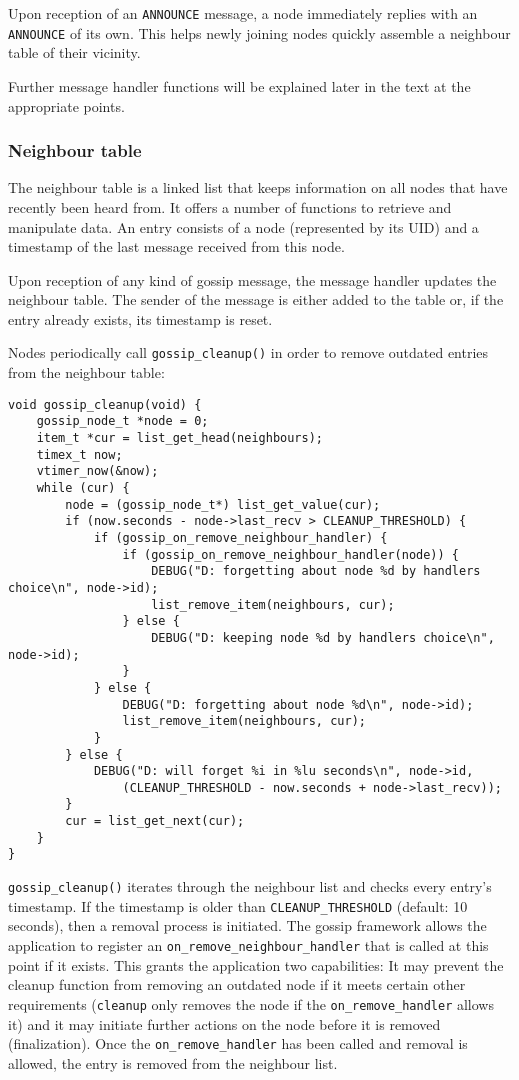 \documentclass[11pt,
  a4paper,
  ngerman,
  BCOR=7mm
]{scrartcl}
\begin{document}
Upon reception of an \lstinline!ANNOUNCE! message, a node immediately
replies with an \lstinline!ANNOUNCE! of its own. This helps newly
joining nodes quickly assemble a neighbour table of their vicinity.

Further message handler functions will be explained later in the text at
the appropriate points.

\subsubsection*{Neighbour table}
\label{ssub:neighbour_table}
The neighbour table is a linked list that keeps information on all nodes
that have recently been heard from. It offers a number of functions to
retrieve and manipulate data. An entry consists of a node (represented
by its UID) and a timestamp of the last message received from this node.

Upon reception of any kind of gossip message, the message handler
updates the neighbour table. The sender of the message is either added
to the table or, if the entry already exists, its timestamp is reset. 

Nodes periodically call \lstinline!gossip_cleanup()! in order to remove
outdated entries from the neighbour table:

\begin{lstlisting}
void gossip_cleanup(void) {
    gossip_node_t *node = 0;
    item_t *cur = list_get_head(neighbours);
    timex_t now;
    vtimer_now(&now);
    while (cur) {
        node = (gossip_node_t*) list_get_value(cur);
        if (now.seconds - node->last_recv > CLEANUP_THRESHOLD) {
            if (gossip_on_remove_neighbour_handler) {
                if (gossip_on_remove_neighbour_handler(node)) {
                    DEBUG("D: forgetting about node %d by handlers choice\n", node->id);
                    list_remove_item(neighbours, cur);
                } else {
                    DEBUG("D: keeping node %d by handlers choice\n", node->id);
                }
            } else {
                DEBUG("D: forgetting about node %d\n", node->id);
                list_remove_item(neighbours, cur);
            }
        } else {
            DEBUG("D: will forget %i in %lu seconds\n", node->id,
                (CLEANUP_THRESHOLD - now.seconds + node->last_recv));
        }
        cur = list_get_next(cur);
    }
}
\end{lstlisting}

\lstinline!gossip_cleanup()! iterates through the neighbour list and
checks every entry's timestamp. If the timestamp is older than
\lstinline!CLEANUP_THRESHOLD! (default: 10 seconds), then a removal
process is initiated. The gossip framework allows the application to
register an \lstinline!on_remove_neighbour_handler! that is called at
this point if it exists. This grants the application two capabilities:
It may prevent the cleanup function from removing an outdated node if it
meets certain other requirements (\lstinline!cleanup! only removes the
node if the \lstinline!on_remove_handler! allows it) and it may initiate
further actions on the node before it is removed (finalization). Once
the \lstinline!on_remove_handler! has been called and removal is
allowed, the entry is removed from the neighbour list.
\end{document}
